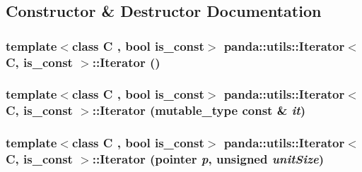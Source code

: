 \subsection{Constructor \& Destructor Documentation}
\hypertarget{classpanda_1_1utils_1_1Iterator_a553c8a95c45984c2a4f48f88441a0fc9}{
\subsubsection[{Iterator}]{\setlength{\rightskip}{0pt plus 5cm}template$<$class C , bool is\_\-const$>$ {\bf panda::utils::Iterator}$<$ C, is\_\-const $>$::{\bf Iterator} ()}}
\label{classpanda_1_1utils_1_1Iterator_a553c8a95c45984c2a4f48f88441a0fc9}
\hypertarget{classpanda_1_1utils_1_1Iterator_ae2d340a932bb75d0f976a05b751b8004}{
\subsubsection[{Iterator}]{\setlength{\rightskip}{0pt plus 5cm}template$<$class C , bool is\_\-const$>$ {\bf panda::utils::Iterator}$<$ C, is\_\-const $>$::{\bf Iterator} ({\bf mutable\_\-type} const \& {\em it})}}
\label{classpanda_1_1utils_1_1Iterator_ae2d340a932bb75d0f976a05b751b8004}
\hypertarget{classpanda_1_1utils_1_1Iterator_a713a9a1ab666137935393f709475a4a4}{
\subsubsection[{Iterator}]{\setlength{\rightskip}{0pt plus 5cm}template$<$class C , bool is\_\-const$>$ {\bf panda::utils::Iterator}$<$ C, is\_\-const $>$::{\bf Iterator} ({\bf pointer} {\em p}, \/  unsigned {\em unitSize})}}
\label{classpanda_1_1utils_1_1Iterator_a713a9a1ab666137935393f709475a4a4}


